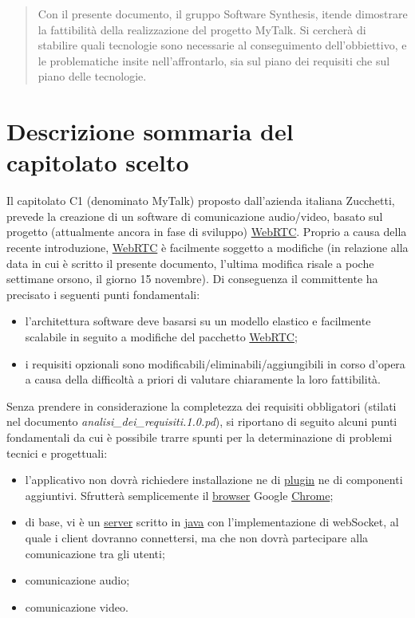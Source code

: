 \begin{abstract}
Con il presente documento, il gruppo Software Synthesis, itende dimostrare la fattibilità della realizzazione del progetto MyTalk. Si cercherà di stabilire quali tecnologie sono necessarie al conseguimento dell'obbiettivo, e le problematiche insite nell'affrontarlo, sia sul piano dei requisiti che sul piano delle tecnologie.
\end{abstract}
\newpage

\section{Descrizione sommaria del capitolato scelto}
Il capitolato C1 (denominato MyTalk) proposto dall'azienda italiana Zucchetti, prevede la creazione di un software di comunicazione audio/video, basato sul progetto (attualmente ancora in fase di sviluppo) \underline{WebRTC}. Proprio a causa della recente introduzione, \underline{WebRTC} è facilmente soggetto a modifiche (in relazione alla data in cui è scritto il presente documento, l'ultima modifica risale a poche settimane orsono, il giorno 15 novembre). Di conseguenza il committente ha precisato i seguenti punti fondamentali:

\begin{itemize}
	\item l'architettura software deve basarsi su un modello elastico e facilmente scalabile in seguito a modifiche del pacchetto \underline{WebRTC};
	\item i requisiti opzionali sono modificabili/eliminabili/aggiungibili in corso d'opera a causa della difficoltà a priori di valutare chiaramente la loro fattibilità.
\end{itemize}

Senza prendere in considerazione la completezza dei requisiti obbligatori (stilati nel documento \textit{analisi\_dei\_requisiti.1.0.pd}), si riportano di seguito alcuni punti fondamentali da cui è possibile trarre spunti per la determinazione di problemi tecnici e progettuali:

\begin{itemize}
	\item l'applicativo non dovrà richiedere installazione ne di \underline{plugin} ne di componenti aggiuntivi. Sfrutterà semplicemente il \underline{browser} Google \underline{Chrome};
	\item di base, vi è un \underline{server} scritto in \underline{java} con l'implementazione di webSocket, al quale i client dovranno connettersi, ma che non dovrà partecipare alla comunicazione tra gli utenti;
	\item comunicazione audio;
	\item comunicazione video.
\end{itemize}

